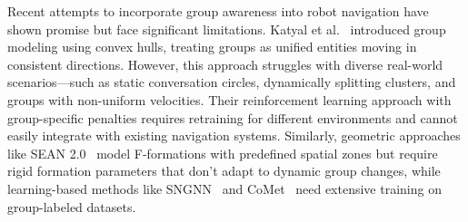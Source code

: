 


Recent attempts to incorporate group awareness into robot navigation have shown promise but face significant limitations. Katyal et al.~\cite{group-aware} introduced group modeling using convex hulls, treating groups as unified entities moving in consistent directions. However, this approach struggles with diverse real-world scenarios—such as static conversation circles, dynamically splitting clusters, and groups with non-uniform velocities. Their reinforcement learning approach with group-specific penalties requires retraining for different environments and cannot easily integrate with existing navigation systems. Similarly, geometric approaches like SEAN 2.0~\cite{tsoi2023sean} model F-formations with predefined spatial zones but require rigid formation parameters that don't adapt to dynamic group changes, while learning-based methods like SNGNN~\cite{wang2023learning} and CoMet~\cite{nishimura2022comet} need extensive training on group-labeled datasets.




